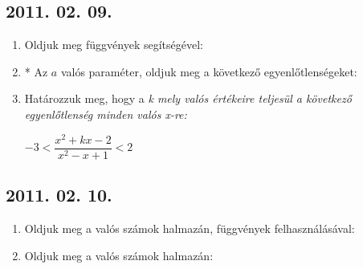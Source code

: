 \subsection*{2011. 02. 09.}
\begin{enumerate}
\item Oldjuk meg függvények segítségével:
\item * Az $a$ valós paraméter, oldjuk meg a következő egyenlőtlenségeket:
\item Határozzuk meg, hogy a \it k \rm mely valós értékeire teljesül a következő egyenlőtlenség minden valós x-re:

$-3 < \dfrac{x^2+kx-2}{x^2-x+1} < 2$
\end{enumerate}
\subsection*{2011. 02. 10.}
\begin{enumerate}
\item Oldjuk meg a valós számok halmazán, függvények felhasználásával:
\item Oldjuk meg a valós számok halmazán:
\end{enumerate}


